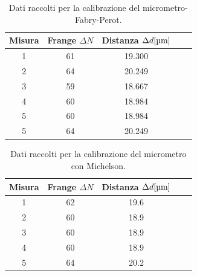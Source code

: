 \documentclass[letterpaper,12pt]{article}
\begin{document}
\begin{table}[h!]
    \centering
    \begin{tabular}{|c|c|c|c|c|}
    \hline
    \textbf{Misura} & \textbf{Frange $\Delta N$} & \textbf{Distanza $\Delta d[\text{\SIUnitSymbolMicro m}]$}  \\
    \hline
    1 & 61 & 19.300 \\
    2 & 64 & 20.249 \\
    3 & 59 & 18.667 \\
    4 & 60 & 18.984 \\
    5 & 60 & 18.984 \\
    5 & 64 & 20.249 \\
    \hline
    \end{tabular}
    \caption{Dati raccolti per la calibrazione del micrometro-Fabry-Perot.}
    \label{tab:calibrazione_micrometro}
\end{table}

\begin{table}[h!]
    \centering
    \begin{tabular}{|c|c|c|c|c|}
    \hline
    \textbf{Misura} & \textbf{Frange $\Delta N$} & \textbf{Distanza $\Delta d [\text{\SIUnitSymbolMicro m}]$}  \\
    \hline
    1 & 62 & 19.6 \\
    2 & 60 & 18.9 \\
    3 & 60 & 18.9 \\
    4 & 60 & 18.9 \\
    5 & 64 & 20.2 \\
    \hline
    \end{tabular}
    \caption{Dati raccolti per la calibrazione del micrometro con Michelson.}
    \label{tab:calibrazione_micrometro_michelson}
\end{table}
\end{document}
